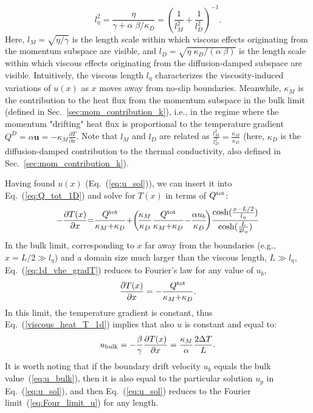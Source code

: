 \documentclass[
prb,
twocolumn,
superscriptaddress,
 amsmath,amssymb,
 aps,
longbibliography,
]{revtex4-2}
\begin{document}
\begin{equation}
  l^2_\eta= \frac{\eta}{\gamma + \alpha\;\beta / \kappa_D}
  =\left(\frac{1}{l_M^2} + \frac{1}{l_D^2} \right)^{-1}.
     \label{eq:viscous_lenght}
\end{equation}
Here, $l_M=\sqrt{\eta/\gamma}$ is the length scale within which viscous effects originating from the momentum subspace are visible, and $l_D= \sqrt{\eta \;\kappa_D /(\alpha\;\beta)}$ is the length scale within which viscous effects originating from the diffusion-damped subspace are visible.
Intuitively, the viscous length $l_\eta$ characterizes the viscosity-induced variations of $u(x)$ as $x$ moves away from no-slip boundaries. Meanwhile, $\kappa_M$ is the contribution to the heat flux from the momentum subspace in the bulk limit (defined in Sec.~\ref{sec:mom_contribution_k}), i.e., in the regime where the momentum "drifting" heat flux is proportional to the temperature gradient $Q^D=\alpha \bm{u}=-\kappa_M \frac{\partial T}{\partial x}$. Note that $l_M$ and $l_D$ are related as $\frac{l_M^2}{l_D^2} = \frac{\kappa_M}{\kappa_D}$ (here, $\kappa_D$ is the diffusion-damped contribution to the thermal conductivity, also defined in Sec.~\ref{sec:mom_contribution_k}).

Having found $u(x)$ (Eq.~(\ref{eq:u_sol})), we can insert it into Eq.~(\ref{eq:Q_tot_1D}) and solve for $T(x)$ in terms of $Q^{\rm tot}$:
\begin{equation}
  \begin{split}
-\frac{\partial T (x)}{\partial x} {=}\frac{Q^{\rm tot}}{\kappa_M{+}\kappa_D}
{+}\!\left(\!\frac{\kappa_M}{\kappa_D}\frac{Q^{\rm tot}}{ \kappa_M{+}\kappa_D}{-}\frac{\alpha u_b}{\kappa_D }\!\right)\!\frac{\cosh(\frac{x-L/2}{l_\eta})}{\cosh(\frac{L}{2l_\eta})}  \end{split}
\label{eq:1d_vhe_gradT}
\raisetag{16mm}
\end{equation}
In the bulk limit, corresponding to $x$ far away from the boundaries (e.g., $x=L/2 \gg l_\eta$)
and a domain size much larger than the viscous length, $L\gg l_\eta$,
 Eq.~(\ref{eq:1d_vhe_gradT}) reduces to Fourier's law for any value of $u_b$,
\begin{equation}
\frac{\partial T (x)}{\partial x} =-\frac{Q^{\rm tot}}{\kappa_M{+}\kappa_D}.
\label{eq:Four_limit_u}
\end{equation}
In this limit, the temperature gradient is constant, thus Eq.~(\ref{viscous_heat_T_1d}) implies that also
$u$ is constant and equal to:
\begin{equation}
u_{\rm bulk}={-\frac{\beta}{\gamma} \frac{\partial T (x)}{\partial x} } =\frac{\kappa_M}{\alpha}\frac{2 \Delta T }{L}.
\label{eq:u_bulk}
\end{equation}
It is worth noting that if the boundary drift velocity $u_b$ equals the bulk value~(\ref{eq:u_bulk}), then it is also equal to the particular solution $u_p$ in Eq.~(\ref{eq:u_sol}), and then Eq.~(\ref{eq:u_sol})  reduces to the Fourier limit~(\ref{eq:Four_limit_u}) for any length.
\end{document}
